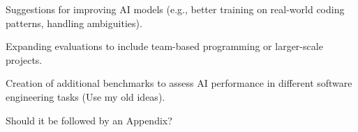 Suggestions for improving AI models (e.g., better training on real-world coding patterns, handling ambiguities).

Expanding evaluations to include team-based programming or larger-scale projects.

Creation of additional benchmarks to assess AI performance in different software engineering tasks (Use my old ideas).

Should it be followed by an Appendix?